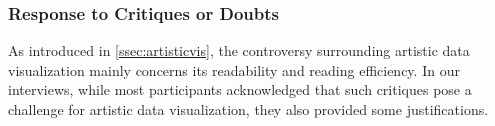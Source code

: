 \subsubsection{Response to Critiques or Doubts}
As introduced in \autoref{ssec:artisticvis}, the controversy surrounding artistic data visualization mainly concerns its readability and reading efficiency. In our interviews, while most participants acknowledged that such critiques pose a challenge for artistic data visualization, they also provided some justifications.



